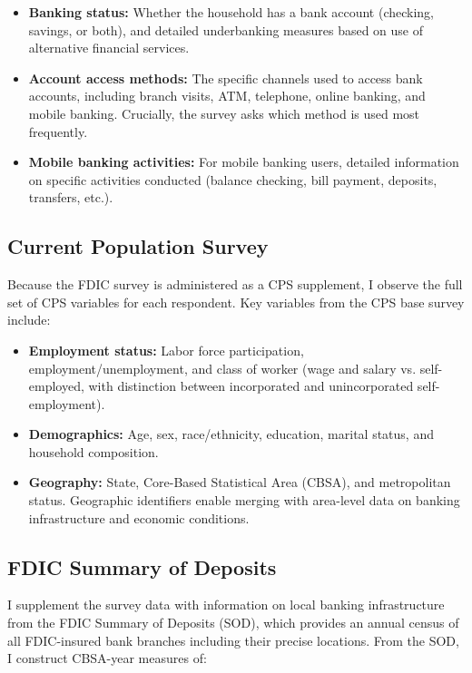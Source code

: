\documentclass[12pt]{article}
\begin{document}
\begin{itemize}
    \item \textbf{Banking status:} Whether the household has a bank account (checking, savings, or both), and detailed underbanking measures based on use of alternative financial services.

    \item \textbf{Account access methods:} The specific channels used to access bank accounts, including branch visits, ATM, telephone, online banking, and mobile banking. Crucially, the survey asks which method is used most frequently.

    \item \textbf{Mobile banking activities:} For mobile banking users, detailed information on specific activities conducted (balance checking, bill payment, deposits, transfers, etc.).
\end{itemize}

\subsection{Current Population Survey}

Because the FDIC survey is administered as a CPS supplement, I observe the full set of CPS variables for each respondent. Key variables from the CPS base survey include:

\begin{itemize}
    \item \textbf{Employment status:} Labor force participation, employment/unemployment, and class of worker (wage and salary vs. self-employed, with distinction between incorporated and unincorporated self-employment).

    \item \textbf{Demographics:} Age, sex, race/ethnicity, education, marital status, and household composition.

    \item \textbf{Geography:} State, Core-Based Statistical Area (CBSA), and metropolitan status. Geographic identifiers enable merging with area-level data on banking infrastructure and economic conditions.
\end{itemize}

\subsection{FDIC Summary of Deposits}

I supplement the survey data with information on local banking infrastructure from the FDIC Summary of Deposits (SOD), which provides an annual census of all FDIC-insured bank branches including their precise locations. From the SOD, I construct CBSA-year measures of:
\end{document}
